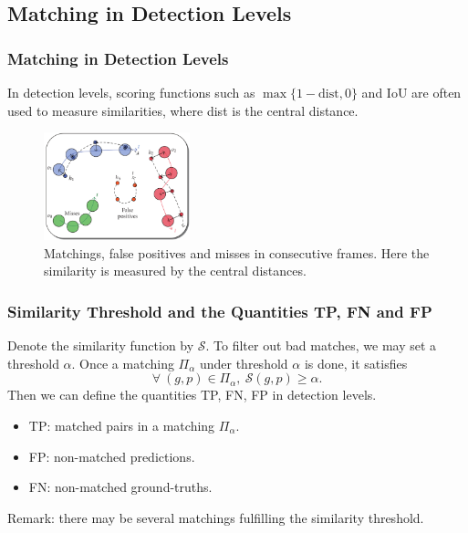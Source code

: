 \documentclass[slidetop, mathserif]{beamer}
\begin{document}
\subsection{Matching in Detection Levels}

\begin{frame}
	\frametitle{Matching in Detection Levels}
			
	In detection levels, scoring functions such as $\max\{1-\text{dist}, 0\}$ and IoU
	are often used to measure similarities, where dist is the central distance.
			
	\begin{figure}
		\includegraphics[width=120pt]{pics/fig2.png}
		\caption{Matchings, false positives and misses in consecutive frames.
		Here the similarity is measured by the central distances.}
	\end{figure}
			
\end{frame}

\begin{frame}
	\frametitle{Similarity Threshold and the Quantities TP, FN and FP}
		
	Denote the similarity function by $\mathcal S$.
	To filter out bad matches, we may set a threshold $\alpha$.
	Once a matching $\Pi_\alpha$ under threshold $\alpha$ is done, it satisfies
	\[
		\forall\ (g,p)\in\Pi_\alpha, ~ \mathcal S(g,p) \geq \alpha.
	\]
	Then we can define the quantities TP, FN, FP in detection levels.
	\begin{itemize}
		\item TP: matched pairs in a matching $\Pi_\alpha$.
		\item FP: non-matched predictions.
		\item FN: non-matched ground-truths.
	\end{itemize}
	Remark: there may be several matchings fulfilling the similarity threshold.
\end{frame}
\end{document}
